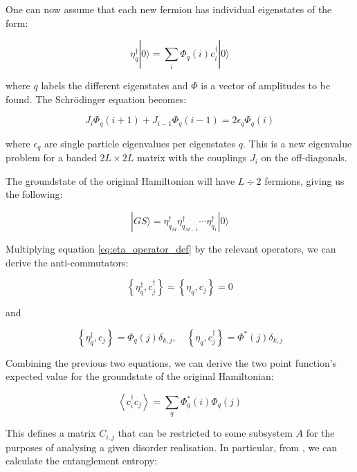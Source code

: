 One can now assume that each new fermion has individual eigenstates of the form:

\begin{equation}\label{eq:eta_operator_def}
\eta_q^{\dagger}|0\rangle = \sum_i \Phi_q(i) c_i^{\dagger}|0\rangle
\end{equation}

where $q$ labels the different eigenstates and $\Phi$ is a vector of amplitudes to be found. The Schrödinger equation becomes: 

\begin{equation}
J_i \Phi_q(i+1)+J_{i-1} \Phi_q(i-1)=2 \epsilon_q \Phi_q(i)
\end{equation}

where $\epsilon_q$ are single particle eigenvalues per eigenstates $q$. This is a new eigenvalue problem for a banded $2L \times 2L$ matrix with the couplings $J_i$ on the off-diagonals. 

The groundstate of the original Hamiltonian will have $L \div 2$ fermions, giving us the following: 

\begin{equation}
|G S\rangle=\eta_{q_M}^{\dagger} \eta_{q_{M-1}}^{\dagger} \cdots \eta_{q_1}^{\dagger}|0\rangle
\end{equation}

Multiplying equation \ref{eq:eta_operator_def} by the relevant operators, we can derive the anti-commutators:

\begin{equation}
\left\{\eta_q^{\dagger}, c_j^{\dagger}\right\}=\left\{\eta_q, c_j\right\}=0
\end{equation}

and

\begin{equation}
\left\{\eta_q^{\dagger}, c_j\right\}=\Phi_q(j) \delta_{k, j}, \quad\left\{\eta_q, c_j^{\dagger}\right\}=\Phi^*(j) \delta_{k, j}
\end{equation}

Combining the previous two equations, we can derive the two point function's expected value for the groundstate of the original Hamiltonian:

\begin{equation}
\left\langle c_i^{\dagger} c_j\right\rangle=\sum_q \Phi_q^*(i) \Phi_q(j)
\end{equation}

This defines a matrix $C_{i, j}$ that can be restricted to some subsystem $A$ for the purposes of analysing a given disorder realisation. In particular, from \cite{peschelReducedDensityMatrices2009}, we can calculate the entanglement entropy:

